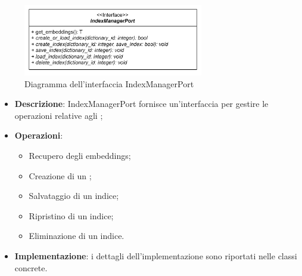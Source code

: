  \label{IndexManagerPort}
\begin{figure}[H]
    \centering
    \includegraphics[width=0.7\textwidth]{assets/Backend/index_manager_port.png}
    \caption{Diagramma dell'interfaccia IndexManagerPort}
  \end{figure}
\begin{itemize}
    \item \textbf{Descrizione}: IndexManagerPort fornisce un'interfaccia per gestire le operazioni  relative agli ;
    \item \textbf{Operazioni}:
    \begin{itemize}
      \item Recupero degli embeddings;
      \item Creazione di un ;
      \item Salvataggio di un indice;
      \item Ripristino di un indice;
      \item Eliminazione di un indice.
    \end{itemize}
    \item \textbf{Implementazione}: i dettagli dell'implementazione sono riportati nelle classi concrete.
\end{itemize} 

